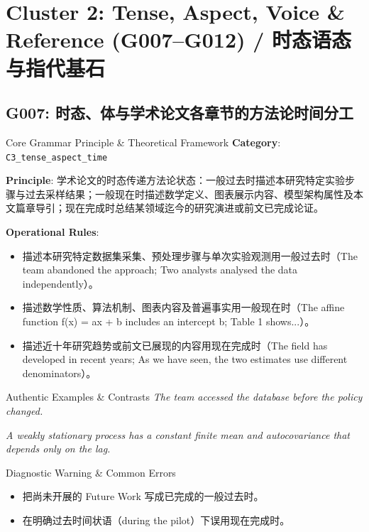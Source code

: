 \section{Cluster 2: Tense, Aspect, Voice \& Reference (G007--G012) / 时态语态与指代基石}
\subsection{G007: 时态、体与学术论文各章节的方法论时间分工}\label{sec:rule:G007}
\begin{ConceptBox}{Core Grammar Principle \& Theoretical Framework}
\textbf{Category}: \texttt{C3\_tense\_aspect\_time}\par\vspace{3pt}
\textbf{Principle}: 学术论文的时态传递方法论状态：一般过去时描述本研究特定实验步骤与过去采样结果；一般现在时描述数学定义、图表展示内容、模型架构属性及本文篇章导引；现在完成时总结某领域迄今的研究演进或前文已完成论证。\par\vspace{4pt}
\textbf{Operational Rules}:
\begin{itemize}[leftmargin=1.5em, itemsep=1pt]
  \item 描述本研究特定数据集采集、预处理步骤与单次实验观测用一般过去时（The team abandoned the approach; Two analysts analysed the data independently）。
  \item 描述数学性质、算法机制、图表内容及普遍事实用一般现在时（The affine function f(x) = ax + b includes an intercept b; Table 1 shows...）。
  \item 描述近十年研究趋势或前文已展现的内容用现在完成时（The field has developed in recent years; As we have seen, the two estimates use different denominators）。
\end{itemize}
\end{ConceptBox}
\begin{ExampleBox}{Authentic Examples \& Contrasts}
\textit{The team accessed the database before the policy changed.}\par\vspace{2pt}
\textit{A weakly stationary process has a constant finite mean and autocovariance that depends only on the lag.}\par\vspace{2pt}
\end{ExampleBox}
\begin{TipBox}{Diagnostic Warning \& Common Errors}
\begin{itemize}[leftmargin=1.5em, itemsep=1pt]
  \item 把尚未开展的 Future Work 写成已完成的一般过去时。
  \item 在明确过去时间状语（during the pilot）下误用现在完成时。
\end{itemize}
\end{TipBox}
\vspace{6pt}
